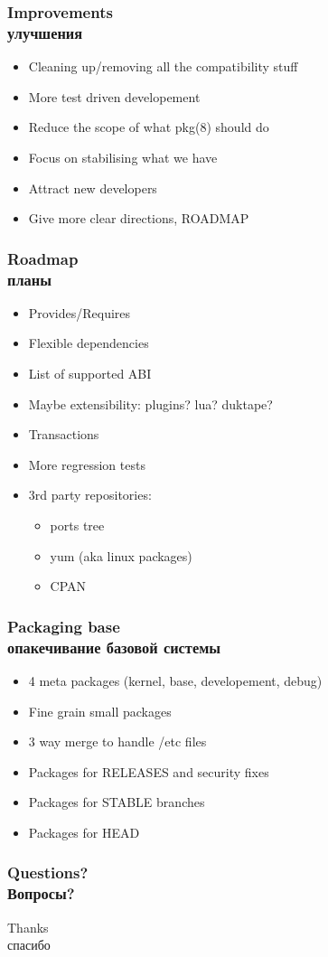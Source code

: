 \begin{frame}
	\frametitle{Improvements \\ улучшения}
	\begin{itemize}
		\item Cleaning up/removing all the compatibility stuff
		\item More test driven developement
		\item Reduce the scope of what pkg(8) should do
		\item Focus on stabilising what we have
		\item Attract new developers
		\item Give more clear directions, ROADMAP
	\end{itemize}
\end{frame}

\begin{frame}
	\frametitle{Roadmap \\ планы}
	\begin{itemize}
		\item Provides/Requires
		\item Flexible dependencies
		\item List of supported ABI
		\item Maybe extensibility: plugins? lua? duktape?
		\item Transactions
		\item More regression tests
		\item 3rd party repositories:
			\begin{itemize}
				\item ports tree
				\item yum (aka linux packages)
				\item CPAN
			\end{itemize}
	\end{itemize}
\end{frame}

\begin{frame}
	\frametitle{Packaging base \\ опакечивание базовой системы}
	\begin{itemize}
		\item 4 meta packages (kernel, base, developement, debug)
		\item Fine grain small packages
		\item 3 way merge to handle /etc files
		\item Packages for RELEASES and security fixes
		\item Packages for STABLE branches
		\item Packages for HEAD
	\end{itemize}
\end{frame}

\begin{frame}[plain]
	\frametitle{Questions? \\ Вопросы?}
	\begin{center}
		\Huge Thanks
		\\
		\Huge спасибо
	\end{center}
\end{frame}


